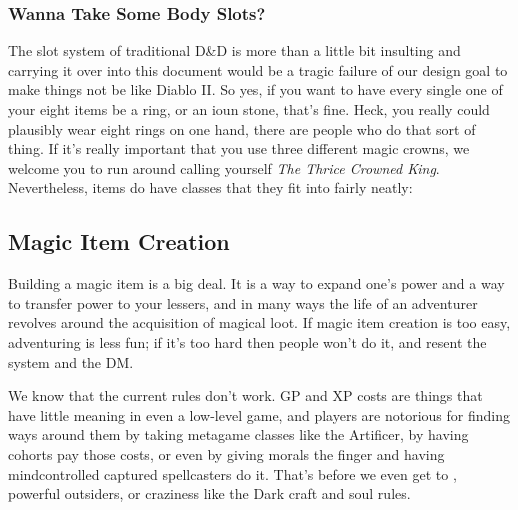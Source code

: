 \subsubsection{Wanna Take Some Body Slots?}

The slot system of traditional D\&D is more than a little bit insulting and carrying it over into this document would be a tragic failure of our design goal to make things not be like Diablo II. So yes, if you want to have every single one of your eight items be a ring, or an ioun stone, that's fine. Heck, you really could plausibly wear eight rings on one hand, there are people who do that sort of thing. If it's really important that you use three different magic crowns, we welcome you to run around calling yourself \textit{The Thrice Crowned King}. Nevertheless, items do have classes that they fit into fairly neatly:

\begin{enumerate}
\end{enumerate}

\subsection{Magic Item Creation}

Building a magic item is a big deal. It is a way to expand one's power and a way to transfer power to your lessers, and in many ways the life of an adventurer revolves around the acquisition of magical loot. If magic item creation is too easy, adventuring is less fun; if it's too hard then people won't do it, and resent the system and the DM.

We know that the current rules don't work. GP and XP costs are things that have little meaning in even a low-level game, and players are notorious for finding ways around them by taking metagame classes like the Artificer, by having cohorts pay those costs, or even by giving morals the finger and having mindcontrolled captured spellcasters do it. That's before we even get to , powerful outsiders, or craziness like the Dark craft and soul rules.

